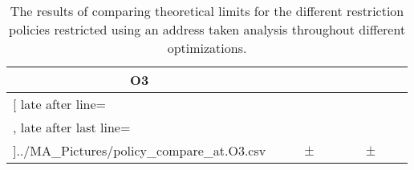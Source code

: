 \begin{table}[!htbp]
{\begin{tabular}{l|c|rcl|c|rcl|c}
\multicolumn{1}{c}{\bfseries O3}
	\\\midrule
	\csvreader[ late after line=\\, late after last line=\\\bottomrule]{../MA_Pictures/policy_compare_at.O3.csv}{
}
	{\csvcolii  &  \csvcoliii & \csvcolx & $\pm$ & \csvcolxi & \csvcolxii & \csvcolxix & $\pm$ & \csvcolxx& \csvcolxxi}%

    	\end{tabular}
}
		\caption {The results of comparing theoretical limits for the different restriction policies restricted using an address taken analysis throughout different optimizations.}
		\label{tbl:policycompat}
\end{table}


